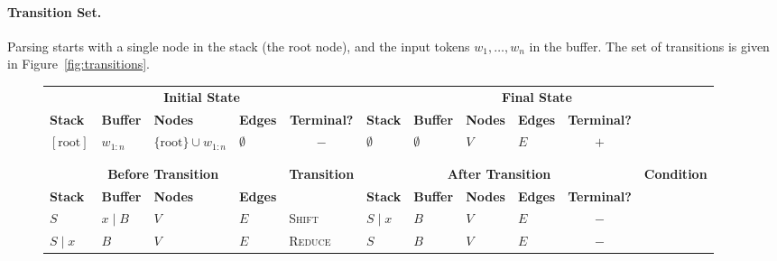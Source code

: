\documentclass[11pt]{article}
\newcommand{\figref}[1]{Figure~\ref{#1}}
\begin{document}
\paragraph{Transition Set.}
Parsing starts with a single node in the stack (the root node), and the input tokens
$w_1, \ldots, w_n$ in the buffer. The set of transitions is given in \figref{fig:transitions}.

\begin{figure*}
\begin{adjustbox}{width=\textwidth,margin=3pt,frame}
\begin{tabular}{llll|l|llllc|c}
\multicolumn{5}{c|}{\textbf{\small Initial State}} & \multicolumn{6}{c}{\textbf{\small Final State}} \\
\textbf{\footnotesize Stack} & \textbf{\footnotesize Buffer} & \textbf{\footnotesize Nodes} & \multicolumn{1}{l}{\textbf{\footnotesize Edges}} & \multicolumn{1}{c|}{\textbf{\footnotesize Terminal?}} & \textbf{\footnotesize Stack} & \textbf{\footnotesize Buffer} & \textbf{\footnotesize Nodes} & \textbf{\footnotesize Edges} & \multicolumn{1}{c}{\textbf{\footnotesize Terminal?}} \\
$[\mathrm{root}]$ & $w_{1:n}$ & \multirow{2}{40pt}{$\{\mathrm{root}\} \cup w_{1:n}$} & \multicolumn{1}{l}{$\emptyset$} & \multicolumn{1}{c|}{$-$} & $\emptyset$ & $\emptyset$ & $V$ & $E$ & \multicolumn{1}{c}{$+$} \\ 
\multicolumn{5}{c|}{} \\
\multicolumn{5}{c|}{} \\
\hline
\multicolumn{4}{c|}{\textbf{\small Before Transition}} & \textbf{\small Transition} & \multicolumn{5}{c|}{\textbf{\small After Transition}} & \textbf{\small Condition} \\
\textbf{\footnotesize Stack} & \textbf{\footnotesize Buffer} & \textbf{\footnotesize Nodes} & \textbf{\footnotesize Edges} & & \textbf{\footnotesize Stack} & \textbf{\footnotesize Buffer} & \textbf{\footnotesize Nodes} & \textbf{\footnotesize Edges} & \textbf{\footnotesize Terminal?} & \\
$S$ & $x \;|\; B$ & $V$ & $E$ & \textsc{Shift} & $S \;|\; x$ & $B$ & $V$ & $E$ & $-$ & \\
$S \;|\; x$ & $B$ & $V$ & $E$ & \textsc{Reduce} & $S$ & $B$ & $V$ & $E$ & $-$ & \\

\end{tabular}
\end{adjustbox}
\end{figure*}
\end{document}
